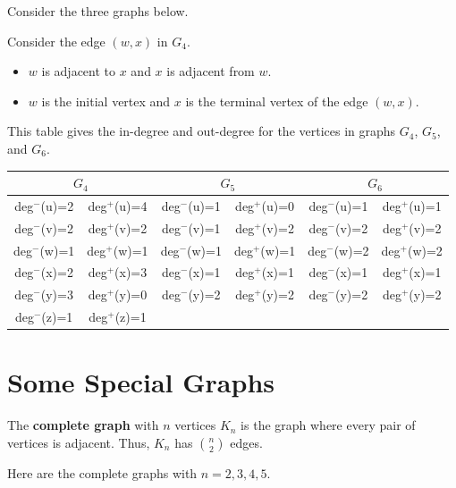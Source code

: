 \begin{exa}\label{exa:directedDegree}
Consider the three graphs below.
\begin{center}
\end{center}
Consider the edge $(w,x)$ in $G_4$.
\begin{itemize}
\item
$w$ is adjacent to $x$ and $x$ is adjacent from $w$.
\item
$w$ is the initial vertex and $x$ is the terminal vertex of the edge $(w,x)$.
\end{itemize}
This table gives the in-degree and out-degree for the vertices in 
graphs $G_4$, $G_5$, and $G_6$.

\noindent
\begin{tabular}{|c|c||c|c||c|c|}
\hline
\multicolumn{2}{|c||}{$G_4$}&\multicolumn{2}{|c||}{$G_5$}&\multicolumn{2}{|c|}{$G_6$}\\
\hline
\hline
deg$^{-}$(u)=2&deg$^{+}$(u)=4&deg$^{-}$(u)=1&deg$^{+}$(u)=0&deg$^{-}$(u)=1&deg$^{+}$(u)=1\\
deg$^{-}$(v)=2&deg$^{+}$(v)=2&deg$^{-}$(v)=1&deg$^{+}$(v)=2&deg$^{-}$(v)=2&deg$^{+}$(v)=2\\
deg$^{-}$(w)=1&deg$^{+}$(w)=1&deg$^{-}$(w)=1&deg$^{+}$(w)=1&deg$^{-}$(w)=2&deg$^{+}$(w)=2\\
deg$^{-}$(x)=2&deg$^{+}$(x)=3&deg$^{-}$(x)=1&deg$^{+}$(x)=1&deg$^{-}$(x)=1&deg$^{+}$(x)=1\\
deg$^{-}$(y)=3&deg$^{+}$(y)=0&deg$^{-}$(y)=2&deg$^{+}$(y)=2&deg$^{-}$(y)=2&deg$^{+}$(y)=2\\
deg$^{-}$(z)=1&deg$^{+}$(z)=1&&&&\\
\hline
\end{tabular}
\end{exa}

\newpage

\section{Some Special Graphs}\label{sec:specialGraphs}

\begin{df}
The {\bf complete graph} with $n$ vertices $K_n$ is the graph where 
every pair of vertices is adjacent. Thus, $K_n$ has $\binom{n}{2}$ edges.
\end{df}
\begin{exa}
Here are the complete graphs with $n=2,3,4,5$.
\begin{center}
\end{center}
\end{exa}

